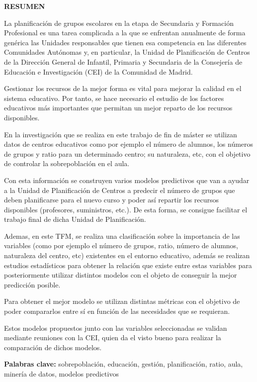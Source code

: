 \documentclass[spanish,12pt,a4paper,twoside,openright]{report}
\begin{document}

\begin{titlepage}
	
	\begin{flushright}
		{\large \bf RESUMEN}
		\\
		\vspace{10pt}
		\textit{}
		{ 
	La planificación de grupos escolares en la etapa de Secundaria y Formación Profesional es una tarea complicada a la que se enfrentan anualmente de forma genérica las Unidades responsables que tienen esa competencia en las diferentes Comunidades Autónomas y, en particular, la Unidad de Planificación de Centros de la Dirección General de Infantil, Primaria y Secundaria de la Consejería de Educación e Investigación (CEI) de la Comunidad de Madrid.

Gestionar los recursos de la mejor forma es vital para mejorar la calidad en el sistema educativo. Por tanto, se hace necesario el estudio de los factores educativos más importantes que permitan un mejor reparto de los recursos disponibles.

En la investigación que se realiza en este trabajo de fin de máster se utilizan datos de centros educativos como por ejemplo el número de alumnos, los números de grupos y ratio para un determinado centro; su naturaleza, etc, con el objetivo de controlar la sobrepoblación en el aula.

Con esta información se construyen varios modelos predictivos que van a ayudar a la Unidad de Planificación de Centros a predecir el número de grupos que deben planificarse para el nuevo curso y poder así repartir los recursos disponibles (profesores, suministros, etc.). De esta forma, se consigue facilitar el trabajo final de dicha Unidad de Planificación.  

Ademas, en este TFM, se realiza una clasificación sobre la importancia de las variables (como por ejemplo el número de grupos, ratio, número de alumnos, naturaleza del centro, etc) existentes en el entorno educativo, además se realizan estudios estadísticos para obtener la relación que existe entre estas variables para posteriormente utilizar distintos modelos con el objeto de conseguir la mejor predicción posible. 

Para obtener el mejor modelo se utilizan distintas métricas con el objetivo de poder compararlos entre sí en función de las necesidades que se requieran.

Estos modelos propuestos junto con las variables seleccionadas se validan mediante reuniones con la CEI, quien da el visto bueno para realizar la comparación de dichos modelos.

		} %
	\end{flushright}
\textbf{Palabras clave: } sobrepoblación, educación, gestión, planificación, ratio, aula, minería de datos, modelos predictivos
\end{titlepage}
\end{document}
